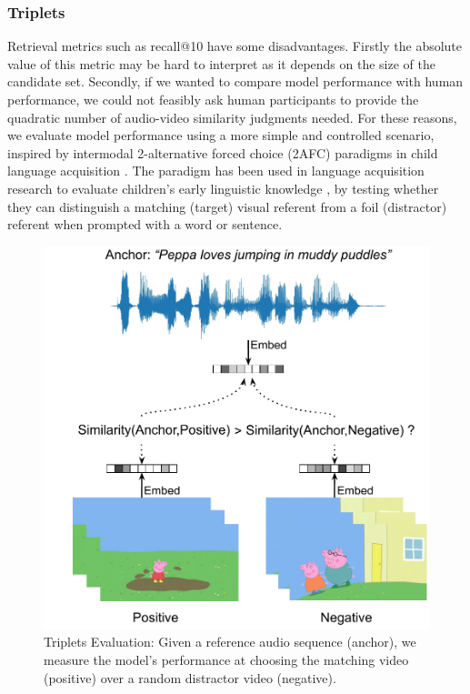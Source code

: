 \subsubsection{Triplets}
\label{sec:triplets}
Retrieval metrics such as recall@10 have some disadvantages. Firstly
the absolute value of this metric may be hard to interpret as it depends
on the size of the candidate set. Secondly, if
we wanted to compare model performance with human performance, we
could not feasibly ask human participants to provide the quadratic
number of audio-video similarity judgments needed. For these reasons,
we evaluate model performance using a more simple and controlled scenario, 
inspired by intermodal 2-alternative forced choice (2AFC) paradigms in child
language acquisition \citep{hirsh1996intermodal}.
The paradigm has been used in language acquisition research to
evaluate children's early linguistic knowledge
\citep[e.g.,][]{noble2011comprehension,bergelson20126}, by testing
whether they can distinguish a matching (target) visual referent from
a foil (distractor) referent when prompted with a word or
sentence.

\begin{figure}
	\centering
	\includegraphics[width=\columnwidth]{peppa_triplets_eval_detailed.pdf}
	\caption{Triplets Evaluation: Given a reference audio sequence (anchor), we 
	measure the model's performance at choosing the matching video (positive) 
	over a random distractor video (negative).}
	\label{fig:triplets_eval}
\end{figure}

